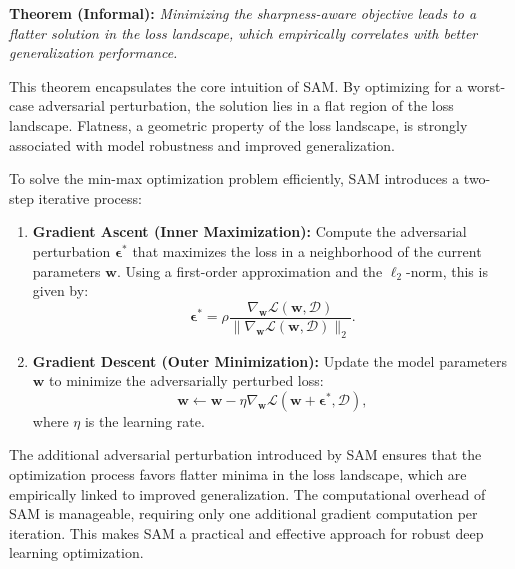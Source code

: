 \documentclass{article}
\begin{document}
\textbf{Theorem (Informal):} \emph{Minimizing the sharpness-aware objective leads to a flatter solution in the loss landscape, which empirically correlates with better generalization performance.}

\noindent This theorem encapsulates the core intuition of SAM. By optimizing for a worst-case adversarial perturbation, the solution lies in a flat region of the loss landscape. Flatness, a geometric property of the loss landscape, is strongly associated with model robustness and improved generalization.

To solve the min-max optimization problem efficiently, SAM introduces a two-step iterative process:

\begin{enumerate}
    \item \textbf{Gradient Ascent (Inner Maximization):} Compute the adversarial perturbation $\boldsymbol{\epsilon}^*$ that maximizes the loss in a neighborhood of the current parameters $\mathbf{w}$. Using a first-order approximation and the $\ell_2$-norm, this is given by:
    \[
    \boldsymbol{\epsilon}^* = \rho \frac{\nabla_{\mathbf{w}} \mathcal{L}(\mathbf{w}, \mathcal{D})}{\|\nabla_{\mathbf{w}} \mathcal{L}(\mathbf{w}, \mathcal{D})\|_2}.
    \]

    \item \textbf{Gradient Descent (Outer Minimization):} Update the model parameters $\mathbf{w}$ to minimize the adversarially perturbed loss:
    \[
    \mathbf{w} \leftarrow \mathbf{w} - \eta \nabla_{\mathbf{w}} \mathcal{L}(\mathbf{w} + \boldsymbol{\epsilon}^*, \mathcal{D}),
    \]
    where $\eta$ is the learning rate.
\end{enumerate}

The additional adversarial perturbation introduced by SAM ensures that the optimization process favors flatter minima in the loss landscape, which are empirically linked to improved generalization. The computational overhead of SAM is manageable, requiring only one additional gradient computation per iteration. This makes SAM a practical and effective approach for robust deep learning optimization.



% 
% 





\end{document}
